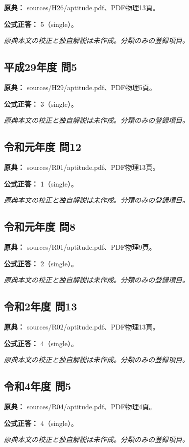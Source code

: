 \noindent\textbf{原典：} sources/H26/aptitude.pdf、PDF物理13頁。

\textbf{公式正答：} 5（single）。

\par\textit{原典本文の校正と独自解説は未作成。分類のみの登録項目。}

\subsection{平成29年度 問5}
\label{q:h29-reg-apt-05}

\noindent\textbf{原典：} sources/H29/aptitude.pdf、PDF物理5頁。

\textbf{公式正答：} 3（single）。

\par\textit{原典本文の校正と独自解説は未作成。分類のみの登録項目。}

\subsection{令和元年度 問12}
\label{q:r01-reg-apt-12}

\noindent\textbf{原典：} sources/R01/aptitude.pdf、PDF物理13頁。

\textbf{公式正答：} 1（single）。

\par\textit{原典本文の校正と独自解説は未作成。分類のみの登録項目。}

\subsection{令和元年度 問8}
\label{q:r01-reg-apt-08}

\noindent\textbf{原典：} sources/R01/aptitude.pdf、PDF物理9頁。

\textbf{公式正答：} 2（single）。

\par\textit{原典本文の校正と独自解説は未作成。分類のみの登録項目。}

\subsection{令和2年度 問13}
\label{q:r02-reg-apt-13}

\noindent\textbf{原典：} sources/R02/aptitude.pdf、PDF物理13頁。

\textbf{公式正答：} 4（single）。

\par\textit{原典本文の校正と独自解説は未作成。分類のみの登録項目。}

\subsection{令和4年度 問5}
\label{q:r04-reg-apt-05}

\noindent\textbf{原典：} sources/R04/aptitude.pdf、PDF物理4頁。

\textbf{公式正答：} 4（single）。

\par\textit{原典本文の校正と独自解説は未作成。分類のみの登録項目。}
